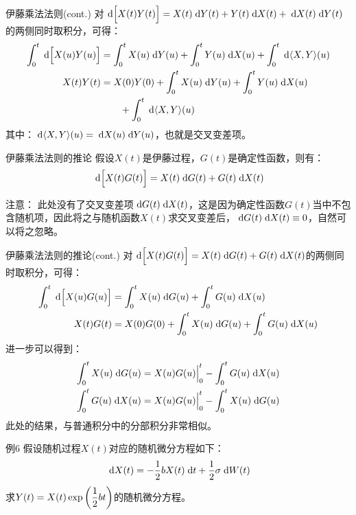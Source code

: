 \documentclass[t]{beamer}
\newcommand{\dif}{{\;\rm d}}
\begin{document}
\begin{frame}{伊藤乘法法则(cont.)}
\normalsize
对$\dif \Big[X(t)Y(t)\Big]=X(t)\dif Y(t)+Y(t)\dif X(t)+{\dif X(t)\dif Y(t)}$的两侧同时取积分，可得：
\begin{align*}
\int^t_0 \dif \Big[X(u)Y(u)\Big]&=\int^t_0 X(u)\dif Y(u)+\int^t_0 Y(u)\dif X(u) +\int^t_0 \dif\langle X, Y\rangle(u)\\
X(t)Y(t)&=X(0)Y(0)+\int^t_0 X(u)\dif Y(u)+\int^t_0 Y(u)\dif X(u)\\
&\qquad +\int^t_0 \dif\langle X, Y\rangle(u)
\end{align*}
其中：$\dif\langle X, Y\rangle(u)=\dif X(u)\dif Y(u)$，也就是交叉变差项。
\end{frame}

\begin{frame}{伊藤乘法法则的推论}
假设$X(t)$是伊藤过程，$G(t)$是确定性函数，则有：
\begin{equation*}
\dif \Big[X(t)G(t)\Big]=X(t)\dif G(t)+G(t)\dif X(t)
\end{equation*}

\begin{block}{注意：}
此处没有了交叉变差项$\dif G(t)\dif X(t)$，这是因为确定性函数$G(t)$当中不包含随机项，因此将之与随机函数$X(t)$求交叉变差后，$\dif G(t)\dif X(t)\equiv 0$，自然可以将之忽略。
\end{block}
\end{frame}

\begin{frame}{伊藤乘法法则的推论(cont.)}\normalsize
对$\dif \Big[X(t)G(t)\Big]=X(t)\dif G(t)+G(t)\dif X(t)$的两侧同时取积分，可得：
\begin{align*}
\int^t_0 \dif \Big[X(u)G(u)\Big]&=\int^t_0 X(u)\dif G(u)+\int^t_0 G(u)\dif X(u)\\
X(t)G(t)&=X(0)G(0)+\int^t_0 X(u)\dif G(u)+\int^t_0 G(u)\dif X(u)\label{int-part}
\end{align*}
进一步可以得到：
\begin{align*}
\int^t_0 X(u)\dif G(u)&=X(u)G(u)\Big|^t_0-\int^t_0 G(u)\dif X(u)\\
\int^t_0 G(u)\dif X(u)&=X(u)G(u)\Big|^t_0-\int^t_0 X(u)\dif G(u)
\end{align*}
此处的结果，与普通积分中的分部积分非常相似。
\end{frame}

\begin{frame}{例6}
假设随机过程$X(t)$对应的随机微分方程如下：
\[\dif X(t)=-\frac{1}{2}bX(t)\dif t+\frac{1}{2}\sigma \dif W(t) \]
求$Y(t)=X(t)\exp\qty(\displaystyle\frac{1}{2}bt)$的随机微分方程。
\end{frame}
\end{document}

